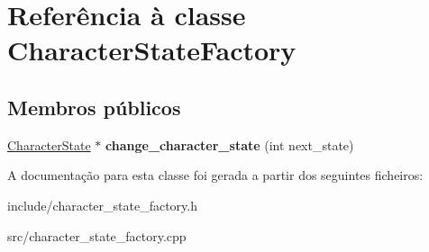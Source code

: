 \hypertarget{classCharacterStateFactory}{}\section{Referência à classe Character\+State\+Factory}
\label{classCharacterStateFactory}
\subsection*{Membros públicos}
\begin{DoxyCompactItemize}
\item 
\mbox{\label{classCharacterStateFactory_abd27e3ed7f361a8e16bdded0de870102}} 
\mbox{\hyperlink{classCharacterState}{Character\+State}} $\ast$ {\bfseries change\+\_\+character\+\_\+state} (int next\+\_\+state)
\end{DoxyCompactItemize}


A documentação para esta classe foi gerada a partir dos seguintes ficheiros\+:\begin{DoxyCompactItemize}
\item 
include/character\+\_\+state\+\_\+factory.\+h\item 
src/character\+\_\+state\+\_\+factory.\+cpp\end{DoxyCompactItemize}
